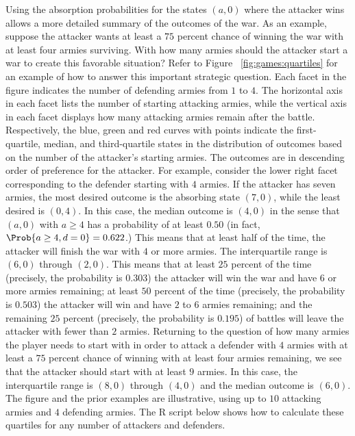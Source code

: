 \documentclass[12pt]{article}
\begin{document}
Using the absorption probabilities for the states \( (a, 0) \) where the
attacker wins allows a more detailed summary of the outcomes of the war.
As an example, suppose the attacker wants at least a \( 75 \) percent
chance of winning the war with at least four armies surviving.  With how
many armies should the attacker start a war to create this favorable
situation?  Refer to Figure~%
\ref{fig:games:quartiles} for an example of how to answer this important
strategic question.  Each facet in the figure indicates the number of
defending armies from \( 1 \) to \( 4 \).  The horizontal axis in each
facet lists the number of starting attacking armies, while the vertical
axis in each facet displays how many attacking armies remain after the
battle.  Respectively, the blue, green and red curves with points
indicate the first-quartile, median, and third-quartile states in the
distribution of outcomes based on the number of the attacker's starting
armies.  The outcomes are in descending order of preference for the
attacker.  For example, consider the lower right facet corresponding to
the defender starting with \( 4 \) armies.  If the attacker has seven
armies, the most desired outcome is the absorbing state \( (7,0) \),
while the least desired is \( (0,4) \).  In this case, the median
outcome is \( (4,0) \) in the sense that \( (a,0) \) with \( a \ge 4 \)
has a probability of at least \( 0.50 \) (in fact, \( \Prob{a \ge 4, d =
0} = 0.622 \).) This means that at least half of the time, the attacker
will finish the war with \( 4 \) or more armies.  The interquartile
range is \( (6,0) \) through \( (2,0) \).  This means that at least \(
25 \) percent of the time (precisely, the probability is \( 0.303 \))
the attacker will win the war and have \( 6 \) or more armies remaining;
at least \( 50 \) percent of the time (precisely, the probability is \(
0.503 \)) the attacker will win and have \( 2 \) to \( 6 \) armies
remaining; and the remaining \( 25 \) percent (precisely, the
probability is \( 0.195 \)) of battles will leave the attacker with
fewer than \( 2 \) armies.  Returning to the question of how many armies
the player needs to start with in order to attack a defender with \( 4 \)
armies with at least a \( 75 \) percent chance of winning with at least
four armies remaining, we see that the attacker should start with at
least \( 9 \) armies.  In this case, the interquartile range is \( (8,0)
\) through \( (4,0) \) and the median outcome is \( (6,0) \).  The
figure and the prior examples are illustrative, using up to \( 10 \)
attacking armies and \( 4 \) defending armies.  The R script below shows
how to calculate these quartiles for any number of attackers and
defenders.
\end{document}
